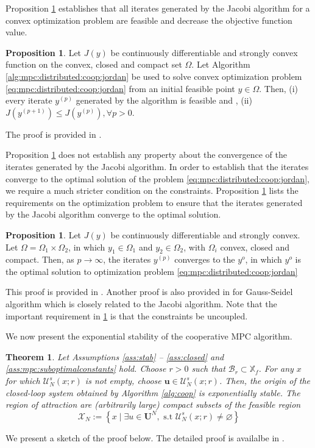 \documentclass[10pt]{article}
\newcommand{\bu}{\mathbf{u}}
\newcommand{\set}[1]{\left\lbrace #1 \right\rbrace}
\newtheorem{theorem}[assumption]{Theorem}
\theoremstyle{definition}
\newtheorem{proposition}[assumption]{Proposition}
\begin{document}
Proposition \ref{prop:mpc:distributed:jordan} establishes that all iterates generated by the Jacobi algorithm for a convex optimization problem are feasible and decrease the objective function value.
\begin{proposition}
\label{prop:mpc:distributed:jordan}
Let $J(y)$ be continuously differentiable and strongly
convex function on the convex, closed and  compact set $\Omega$.
Let Algorithm \ref{alg:mpc:distributed:coop:jordan} be used to solve
convex optimization problem \eqref{eq:mpc:distributed:coop:jordan}
from an initial feasible point $y \in \Omega$. Then, (i) every iterate
$y^{(p)}$ generated by the algorithm is feasible and , (ii)
$J(y^{(p+1)}) \leq J(y^{(p)}), \forall p>0$.
\end{proposition}
The proof is provided in  \citet{stewart:venkat:rawlings:wright:pannocchia:2010}.

Proposition \ref{prop:mpc:distributed:jordan} does not establish any property about the convergence of the iterates generated by the Jacobi algorithm. In order to establish that the iterates converge to the optimal solution of the problem \eqref{eq:mpc:distributed:coop:jordan}, we require a much stricter condition on the constraints. Proposition \ref{prop:mpc:distributed:jordan:converge} lists the requirements on the optimization problem to ensure that the iterates generated by the Jacobi algorithm converge to the optimal solution.
\begin{proposition}
\label{prop:mpc:distributed:jordan:converge}
Let $J(y)$ be continuously differentiable and strongly
convex. Let $\Omega = \Omega_1 \times \Omega_2$, in which $y_1 \in
\Omega_1$ and $y_2 \in \Omega_2$, with $\Omega_i$  convex, closed and compact. Then, as $p
\rightarrow \infty$, the iterates $y^{(p)}$ converges to the $y^o$, in
which $y^o$ is the optimal solution to optimization problem
\eqref{eq:mpc:distributed:coop:jordan}
\end{proposition}  
This proof is provided in  \citet{stewart:venkat:rawlings:wright:pannocchia:2010}. Another
proof is also provided in \citet[Prop 3.9]{bertsekas:tsitsiklis:1989}
for Gauss-Seidel algorithm which is closely related to the Jacobi
algorithm.  Note that the important requirement in \ref{prop:mpc:distributed:jordan:converge} is that the constraints be uncoupled.

We now present the exponential stability of the cooperative MPC algorithm.
\begin{theorem}
Let Assumptions \ref{ass:stab} -- \ref{ass:closed} and
\ref{ass:mpc:suboptimalconstants} 
hold. Choose $r>0$ such that $\mathcal{B}_r \subset \mathbb{X}_f$. For
any $x$ for which  $\mathcal{U}_N^s(x;r)$  is not empty, choose 
$\bu \in \mathcal{U}_N^s(x;r)$. Then, the origin of the closed-loop system 
obtained by Algorithm \ref{alg:coop}
is exponentially stable. The region of attraction are (arbitrarily large) compact  subsets of
the feasible region \[\mathcal{X}_N :=\set{x\mid \exists u \in
 \mathbf{U}^N, \text{~s.t~} \mathcal{U}^s_N(x;r) \neq \varnothing}\]
\end{theorem}
We present a sketch of the proof below. The detailed proof is
availalbe in  \citet{stewart:venkat:rawlings:wright:pannocchia:2010}.
\end{document}

